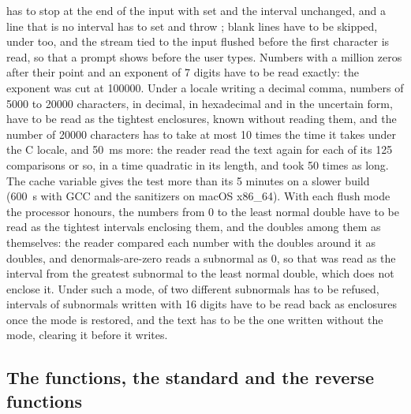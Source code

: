 \documentclass[12pt,a4paper,twoside,openright]{book}
\begin{document}
\medskip
{} has to stop at the end of the input with
 set and the interval unchanged, and a line that is no
interval has to set  and throw ;
blank lines have to be skipped, under  too, and the
stream tied to the input flushed before the first character is read, so that
a prompt shows before the user types.\newinvfive{} Numbers with a million
zeros after their point and an exponent of 7 digits have to be read exactly:
the exponent was cut at 100000. Under a locale writing a decimal comma,
numbers of 5000 to 20000 characters, in decimal, in hexadecimal and in the
uncertain form, have to be read as the tightest enclosures, known without
reading them, and the number of 20000 characters has to take at most 10
times the time it takes under the C locale, and 50~ms more: the reader read
the text again for each of its 125 comparisons or so, in a time quadratic
in its length, and took 50 times as long.\newinvfive{} The cache variable
 gives the test more than its 5 minutes on a
slower build (600~s with GCC and the sanitizers on macOS x86\_64). With
each flush mode the processor honours, the numbers from 0 to the least
normal double have to be read as the tightest intervals enclosing them, and
the doubles among them as themselves: the reader compared each number with
the doubles around it as doubles, and denormals-are-zero reads a subnormal
as 0, so that  was read as the interval from the greatest
subnormal to the least normal double, which does not enclose
it.\newinvfive{} Under such a mode,  of two different
subnormals has to be refused, intervals of subnormals written with 16
digits have to be read back as enclosures once the mode is restored, and
the text has to be the one written without the mode, 
clearing it before it writes.\newinvfive

\subsection{The functions, the standard and the reverse functions}
\end{document}
